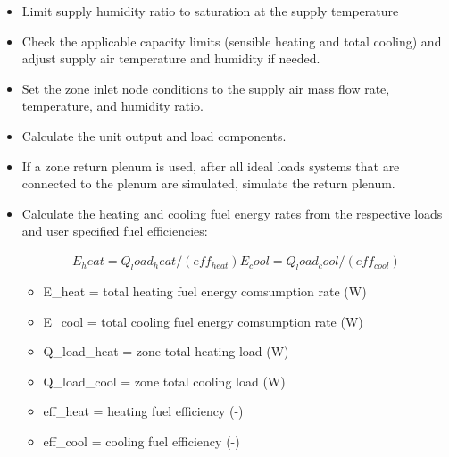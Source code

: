 \begin{itemize}
  \item Limit supply humidity ratio to saturation at the supply temperature
  \item Check the applicable capacity limits (sensible heating and total cooling) and adjust supply air temperature and humidity if needed.
  \item Set the zone inlet node conditions to the supply air mass flow rate, temperature, and humidity ratio.
  \item Calculate the unit output and load components.
  \item If a zone return plenum is used, after all ideal loads systems that are connected to the plenum are simulated, simulate the return plenum.
  \item Calculate the heating and cooling fuel energy rates from the respective loads and user specified fuel efficiencies:

    \begin{equation}
      {E_heat} = {\dot Q_load_heat}/(eff_{heat})
	  {E_cool} = {\dot Q_load_cool}/(eff_{cool})
    \end{equation}
	
    \begin{itemize}
      \item {E_heat} = total heating fuel energy comsumption rate (W)
	  \item {E_cool} = total cooling fuel energy comsumption rate (W)
	  \item {\dot Q_load_heat} = zone total heating load (W)
	  \item {\dot Q_load_cool} = zone total cooling load (W)
	  \item {eff_heat} = heating fuel efficiency (-)
	  \item {eff_cool} = cooling fuel efficiency (-)	  
    \end{itemize} 	
	
\end{itemize}

